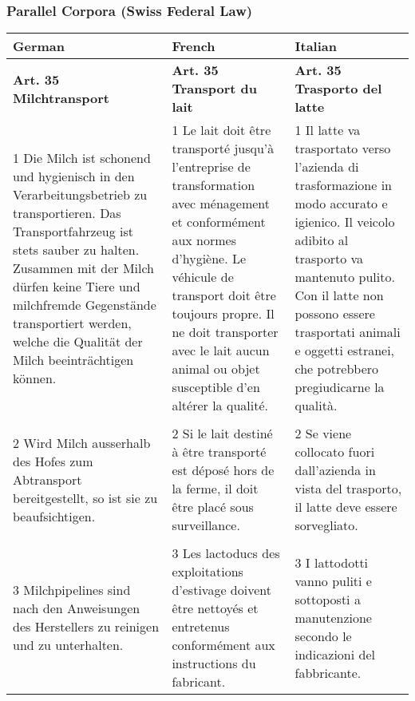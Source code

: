 \begin{frame}[fragile]
\frametitle{Parallel Corpora (Swiss Federal Law)}
\color{structure}
\begin{small}
\begin{center}
\begin{tabular}{p{105pt}p{105pt}p{105pt}}
\hline
\textbf{German}& \textbf{French}& \textbf{Italian} \\
\hline
\textbf{Art. 35 Milchtransport}& \textbf{Art. 35 Transport du lait}& \textbf{Art. 35 Trasporto del latte} \\
\hline
1 Die Milch ist schonend und hygienisch in den Verarbeitungsbetrieb zu transportieren. Das Transportfahrzeug ist stets sauber zu halten. Zusammen mit der Milch d\"{u}rfen keine Tiere und milchfremde Gegenst\"{a}nde transportiert werden, welche die Qualit\"{a}t der Milch beeintr\"{a}chtigen k\"{o}nnen. &
1 Le lait doit \^{e}tre transport\'{e} jusqu'\`{a} l'entreprise de transformation avec m\'{e}nagement et conform\'{e}ment aux normes d'hygi\`{e}ne. Le v\'{e}hicule de transport doit \^{e}tre toujours propre. Il ne doit transporter avec le lait aucun animal ou objet susceptible d'en alt\'{e}rer la qualit\'{e}.
&
1 Il latte va trasportato verso l'azienda di trasformazione in modo accurato e igienico. Il veicolo adibito al trasporto va mantenuto pulito. Con il latte non possono essere trasportati animali e oggetti estranei, che potrebbero pregiudicarne la qualit\`{a}.\\
 &&\\
2 Wird Milch ausserhalb des Hofes zum Abtransport bereitgestellt, so ist sie zu beaufsichtigen. &
2 Si le lait destin\'{e} \`{a} \^{e}tre transport\'{e} est d\'{e}pos\'{e} hors de la ferme, il doit \^{e}tre plac\'{e} sous surveillance.
&
 2 Se viene collocato fuori dall'azienda in vista del trasporto, il latte deve essere sorvegliato.\\
&&\\
3 Milchpipelines sind nach den Anweisungen des Herstellers zu reinigen und zu unterhalten.
&
3 Les lactoducs des exploitations d'estivage doivent \^{e}tre nettoy\'{e}s et entretenus conform\'{e}ment aux instructions du fabricant.
&
3 I lattodotti vanno puliti e sottoposti a manutenzione secondo le indicazioni del fabbricante. \\
\hline
\end{tabular}
\end{center}
\end{small}
\end{frame}

